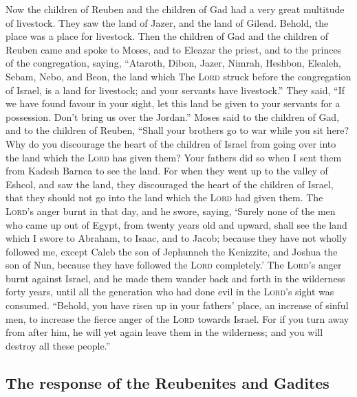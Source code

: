  Now the children of Reuben and the children of Gad had a
very great multitude of livestock. They saw the land of Jazer, and the
land of Gilead. Behold, the place was a place for livestock.
 Then the children of Gad and the children of Reuben came
and spoke to Moses, and to Eleazar the priest, and to the princes of the
congregation, saying,  ``Ataroth, Dibon, Jazer, Nimrah,
Heshbon, Elealeh, Sebam, Nebo, and Beon,  the land which
The \textsc{Lord} struck before the congregation of Israel, is a land
for livestock; and your servants have livestock.''  They
said, ``If we have found favour in your sight, let this land be given to
your servants for a possession. Don't bring us over the Jordan.''
 Moses said to the children of Gad, and to the children of
Reuben, ``Shall your brothers go to war while you sit here?
 Why do you discourage the heart of the children of Israel
from going over into the land which the \textsc{Lord} has given them?
 Your fathers did so when I sent them from Kadesh Barnea
to see the land.  For when they went up to the valley of
Eshcol, and saw the land, they discouraged the heart of the children of
Israel, that they should not go into the land which the \textsc{Lord}
had given them.  The \textsc{Lord}'s anger burnt in that
day, and he swore, saying,  `Surely none of the men who
came up out of Egypt, from twenty years old and upward, shall see the
land which I swore to Abraham, to Isaac, and to Jacob; because they have
not wholly followed me,  except Caleb the son of
Jephunneh the Kenizzite, and Joshua the son of Nun, because they have
followed the \textsc{Lord} completely.'  The
\textsc{Lord}'s anger burnt against Israel, and he made them wander back
and forth in the wilderness forty years, until all the generation who
had done evil in the \textsc{Lord}'s sight was consumed. 
``Behold, you have risen up in your fathers' place, an increase of
sinful men, to increase the fierce anger of the \textsc{Lord} towards
Israel.  For if you turn away from after him, he will yet
again leave them in the wilderness; and you will destroy all these
people.''

\hypertarget{the-response-of-the-reubenites-and-gadites}{%
\subsection{The response of the Reubenites and
Gadites}\label{the-response-of-the-reubenites-and-gadites}}

